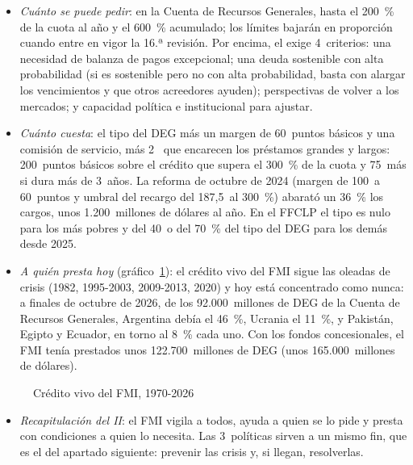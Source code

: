 \documentclass[11pt]{article}
\begin{document}
\begin{itemize}
\item \emph{Cuánto se puede pedir}: en la Cuenta de Recursos Generales, hasta el 200~\% de la cuota al año y el 600~\% acumulado; los límites bajarán en proporción cuando entre en vigor la 16.ª revisión\nocite{FMI2024LimitesAcceso}. Por encima, el  exige 4~criterios: una necesidad de balanza de pagos excepcional; una deuda sostenible con alta probabilidad (si es sostenible pero no con alta probabilidad, basta con alargar los vencimientos y que otros acreedores ayuden); perspectivas de volver a los mercados; y capacidad política e institucional para ajustar.
\item \emph{Cuánto cuesta}: el tipo del DEG más un margen de 60~puntos básicos y una comisión de servicio, más 2~ que encarecen los préstamos grandes y largos: 200~puntos básicos sobre el crédito que supera el 300~\% de la cuota y 75~más si dura más de 3~años. La reforma de octubre de 2024 (margen de 100~a 60~puntos y umbral del recargo del 187,5~al 300~\%) abarató un 36~\% los cargos, unos 1.200~millones de dólares al año\nocite{FMI2024Recargos}. En el FFCLP el tipo es nulo para los más pobres y del 40~o del 70~\% del tipo del DEG para los demás desde 2025.
\item \emph{A quién presta hoy} (gráfico~\ref{fig:credito-fmi}): el crédito vivo del FMI sigue las oleadas de crisis (1982, 1995-2003, 2009-2013, 2020) y hoy está concentrado como nunca: a finales de octubre de 2026, de los 92.000~millones de DEG de la Cuenta de Recursos Generales, Argentina debía el 46~\%, Ucrania el 11~\%, y Pakistán, Egipto y Ecuador, en torno al 8~\% cada uno. Con los fondos concesionales, el FMI tenía prestados unos 122.700~millones de DEG (unos 165.000~millones de dólares)\nocite{FMI2026FA}.
\end{itemize}

\begin{figure}[H]
\centering
\caption{Crédito vivo del FMI, 1970-2026}\label{fig:credito-fmi}
\end{figure}

\begin{itemize}
\item \emph{Recapitulación del II}: el FMI vigila a todos, ayuda a quien se lo pide y presta con condiciones a quien lo necesita. Las 3~políticas sirven a un mismo fin, que es el del apartado siguiente: prevenir las crisis y, si llegan, resolverlas.
\end{itemize}
\end{document}

